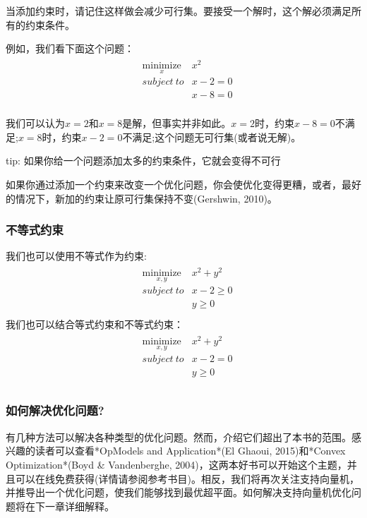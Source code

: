 当添加约束时，请记住这样做会减少可行集。要接受一个解时，这个解必须满足所有的约束条件。

例如，我们看下面这个问题：
\begin{gather*}
\begin{align*}
& \underset{x}{\text{minimize}} & x^2 \\
& subject \ to  & x-2=0 \\
& & x-8=0 \\
\end{align*}
\end{gather*}

我们可以认为$x=2$和$x=8$是解，但事实并非如此。$x=2$时，约束$x-8=0$不满足;$x=8$时，约束$x-2=0$不满足;这个问题无可行集(或者说无解)。

tip: 如果你给一个问题添加太多的约束条件，它就会变得不可行

如果你通过添加一个约束来改变一个优化问题，你会使优化变得更糟，或者，最好的情况下，新加的约束让原可行集保持不变(Gershwin, 2010)。

\subsubsection{不等式约束}

我们也可以使用不等式作为约束:
\begin{gather*}
\begin{align*}
& \underset{x,y}{\text{minimize}} & x^2+y^2 \\
& subject \ to  & x-2 \geq 0 \\
& &  y \geq 0 \\
\end{align*}
\end{gather*}
我们也可以结合等式约束和不等式约束：
\begin{gather*}
\begin{align*}
& \underset{x,y}{\text{minimize}} & x^2+y^2 \\
& subject \ to  & x-2 = 0 \\
& &  y \geq 0 \\
\end{align*}
\end{gather*}
\subsubsection{如何解决优化问题?}

有几种方法可以解决各种类型的优化问题。然而，介绍它们超出了本书的范围。感兴趣的读者可以查看*OpModels and Application*(El Ghaoui, 2015)和*Convex Optimization*(Boyd \& Vandenberghe, 2004)，这两本好书可以开始这个主题，并且可以在线免费获得(详情请参阅参考书目)。相反，我们将再次关注支持向量机，并推导出一个优化问题，使我们能够找到最优超平面。如何解决支持向量机优化问题将在下一章详细解释。

